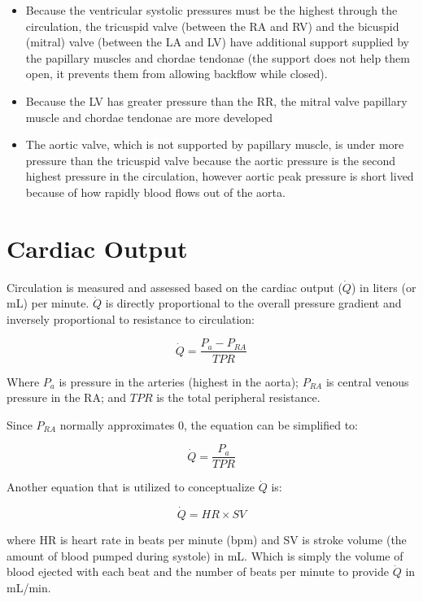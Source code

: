 \begin{itemize}
    \item Because the ventricular systolic pressures must be the highest through the circulation, the tricuspid valve (between the RA and RV) and the bicuspid (mitral) valve (between the LA and LV) have additional support supplied by the papillary muscles and chordae tendonae (the support does not help them open, it prevents them from allowing backflow while closed).
    \item Because the LV has greater pressure than the RR, the mitral valve papillary muscle and chordae tendonae are more developed
    \item The aortic valve, which is not supported by papillary muscle, is under more pressure than the tricuspid valve because the aortic pressure is the second highest pressure in the circulation, however aortic peak pressure is short lived because of how rapidly blood flows out of the aorta.
\end{itemize}

\section{Cardiac Output}

Circulation is measured and assessed based on the cardiac output ($\dot{Q}$) in liters (or mL) per minute. $\dot{Q}$ is directly proportional to the overall pressure gradient and inversely proportional to resistance to circulation:

\begin{equation}
    \dot{Q} = \frac{P_{a} - P_{RA}}{TPR}
    \label{Q}
\end{equation}

Where $P_{a}$ is pressure in the arteries (highest in the aorta); $P_{RA}$ is central venous pressure in the RA; and $TPR$ is the total peripheral resistance.

Since $P_{RA}$ normally approximates 0, the equation can be simplified to:

\begin{equation}
    \dot{Q} = \frac{P_{a}}{TPR}
    \label{Q_simplified}
\end{equation}

Another equation that is utilized to conceptualize $\dot{Q}$ is:

\begin{equation}
    \dot{Q} = HR \times SV
    \label{Q_HRSV}
\end{equation}

where HR is heart rate in beats per minute (bpm) and SV is stroke volume (the amount of blood pumped during systole) in mL. Which is simply the volume of blood ejected with each beat and the number of beats per minute to provide $\dot{Q}$ in mL/min.


